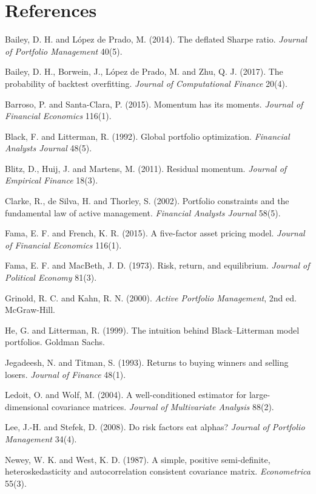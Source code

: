 \documentclass[10pt,a4paper]{article}
\begin{document}
\section*{References}
\footnotesize
\begin{description}\setlength\itemsep{0pt}
\item Bailey, D. H. and L\'opez de Prado, M. (2014). The deflated Sharpe ratio. \emph{Journal of Portfolio Management} 40(5).
\item Bailey, D. H., Borwein, J., L\'opez de Prado, M. and Zhu, Q. J. (2017). The probability of backtest overfitting. \emph{Journal of Computational Finance} 20(4).
\item Barroso, P. and Santa-Clara, P. (2015). Momentum has its moments. \emph{Journal of Financial Economics} 116(1).
\item Black, F. and Litterman, R. (1992). Global portfolio optimization. \emph{Financial Analysts Journal} 48(5).
\item Blitz, D., Huij, J. and Martens, M. (2011). Residual momentum. \emph{Journal of Empirical Finance} 18(3).
\item Clarke, R., de Silva, H. and Thorley, S. (2002). Portfolio constraints and the fundamental law of active management. \emph{Financial Analysts Journal} 58(5).
\item Fama, E. F. and French, K. R. (2015). A five-factor asset pricing model. \emph{Journal of Financial Economics} 116(1).
\item Fama, E. F. and MacBeth, J. D. (1973). Risk, return, and equilibrium. \emph{Journal of Political Economy} 81(3).
\item Grinold, R. C. and Kahn, R. N. (2000). \emph{Active Portfolio Management}, 2nd ed. McGraw-Hill.
\item He, G. and Litterman, R. (1999). The intuition behind Black--Litterman model portfolios. Goldman Sachs.
\item Jegadeesh, N. and Titman, S. (1993). Returns to buying winners and selling losers. \emph{Journal of Finance} 48(1).
\item Ledoit, O. and Wolf, M. (2004). A well-conditioned estimator for large-dimensional covariance matrices. \emph{Journal of Multivariate Analysis} 88(2).
\item Lee, J.-H. and Stefek, D. (2008). Do risk factors eat alphas? \emph{Journal of Portfolio Management} 34(4).
\item Newey, W. K. and West, K. D. (1987). A simple, positive semi-definite, heteroskedasticity and autocorrelation consistent covariance matrix. \emph{Econometrica} 55(3).
\end{description}
\end{document}
